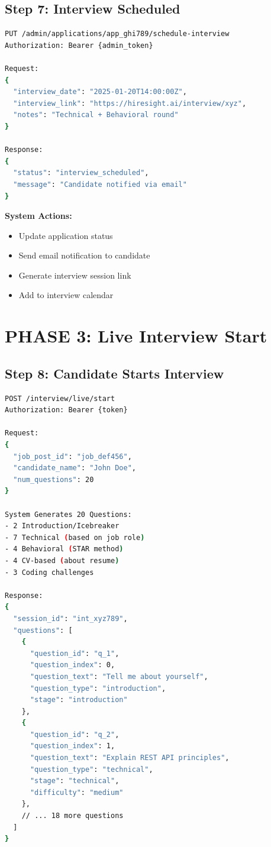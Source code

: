 \documentclass[12pt,a4paper]{article}
\begin{document}
\subsection{Step 7: Interview Scheduled}

\begin{lstlisting}[language=bash, caption=Schedule Interview API]
PUT /admin/applications/app_ghi789/schedule-interview
Authorization: Bearer {admin_token}

Request:
{
  "interview_date": "2025-01-20T14:00:00Z",
  "interview_link": "https://hiresight.ai/interview/xyz",
  "notes": "Technical + Behavioral round"
}

Response:
{
  "status": "interview_scheduled",
  "message": "Candidate notified via email"
}
\end{lstlisting}

\textbf{System Actions:}
\begin{itemize}
    \item Update application status
    \item Send email notification to candidate
    \item Generate interview session link
    \item Add to interview calendar
\end{itemize}

\newpage

\section{PHASE 3: Live Interview Start}

\subsection{Step 8: Candidate Starts Interview}

\begin{lstlisting}[language=bash, caption=Start Interview API]
POST /interview/live/start
Authorization: Bearer {token}

Request:
{
  "job_post_id": "job_def456",
  "candidate_name": "John Doe",
  "num_questions": 20
}

System Generates 20 Questions:
- 2 Introduction/Icebreaker
- 7 Technical (based on job role)
- 4 Behavioral (STAR method)
- 4 CV-based (about resume)
- 3 Coding challenges

Response:
{
  "session_id": "int_xyz789",
  "questions": [
    {
      "question_id": "q_1",
      "question_index": 0,
      "question_text": "Tell me about yourself",
      "question_type": "introduction",
      "stage": "introduction"
    },
    {
      "question_id": "q_2",
      "question_index": 1,
      "question_text": "Explain REST API principles",
      "question_type": "technical",
      "stage": "technical",
      "difficulty": "medium"
    },
    // ... 18 more questions
  ]
}
\end{lstlisting}
\end{document}
